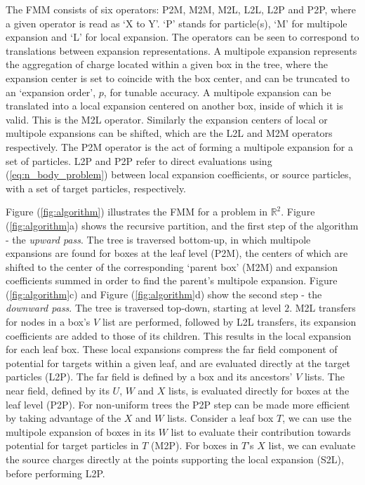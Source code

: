 \documentclass{IEEEcsmag}
\begin{document}
The FMM consists of six operators: P2M, M2M, M2L, L2L, L2P and P2P, where a given operator is read as `X to Y'. `P' stands for particle(s), `M' for multipole expansion and `L' for local expansion. The operators can be seen to correspond to translations between expansion representations. A multipole expansion represents the aggregation of charge located within a given box in the tree, where the expansion center is set to coincide with the box center, and can be truncated to an `expansion order', $p$, for tunable accuracy. A multipole expansion can be translated into a local expansion centered on another box, inside of which it is valid. This is the M2L operator. Similarly the expansion centers of local or multipole expansions can be shifted, which are the L2L and M2M operators respectively. The P2M operator is the act of forming a multipole expansion for a set of particles. L2P and P2P refer to direct evaluations using (\ref{eq:n_body_problem}) between local expansion coefficients, or source particles, with a set of target particles, respectively.

Figure (\ref{fig:algorithm}) illustrates the FMM for a problem in $\mathbb{R}^2$. Figure (\ref{fig:algorithm}a) shows the recursive partition, and the first step of the algorithm - the \textit{upward pass}. The tree is traversed bottom-up, in which multipole expansions are found for boxes at the leaf level (P2M), the centers of which are shifted to the center of the corresponding `parent box' (M2M) and expansion coefficients summed in order to find the parent's multipole expansion. Figure (\ref{fig:algorithm}c) and Figure (\ref{fig:algorithm}d) show the second step - the \textit{downward pass}. The tree is traversed top-down, starting at level $2$. M2L transfers for nodes in a box's $V$ list are performed, followed by L2L transfers, its expansion coefficients are added to those of its children. This results in the local expansion for each leaf box. These local expansions compress the far field component of potential for targets within a given leaf, and are evaluated directly at the target particles (L2P). The far field is defined by a box and its ancestors' $V$ lists. The near field, defined by its $U$, $W$ and $X$ lists, is evaluated directly for boxes at the leaf level (P2P). For non-uniform trees the P2P step can be made more efficient by taking advantage of the $X$ and $W$ lists. Consider a leaf box $T$, we can use the multipole expansion of boxes in its $W$ list to evaluate their contribution towards potential for target particles in $T$ (M2P). For boxes in $T$'s $X$ list, we can evaluate the source charges directly at the points supporting the local expansion (S2L), before performing L2P.
\end{document}
